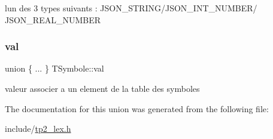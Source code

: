 l\textquotesingle{}un des 3 types suivants \+: J\+S\+O\+N\+\_\+\+S\+T\+R\+I\+N\+G/\+J\+S\+O\+N\+\_\+\+I\+N\+T\+\_\+\+N\+U\+M\+B\+E\+R/ J\+S\+O\+N\+\_\+\+R\+E\+A\+L\+\_\+\+N\+U\+M\+B\+ER \mbox{\label{structTSymbole_a448dc40c2c8e5d050436fa598f528723}} 
\subsubsection{\texorpdfstring{val}{val}}
{\footnotesize\ttfamily union \{ ... \}   T\+Symbole\+::val}

valeur associer a un element de la table des symboles 

The documentation for this union was generated from the following file\+:\begin{DoxyCompactItemize}
\item 
include/\hyperlink{tp2__lex_8h}{tp2\+\_\+lex.\+h}\end{DoxyCompactItemize}
